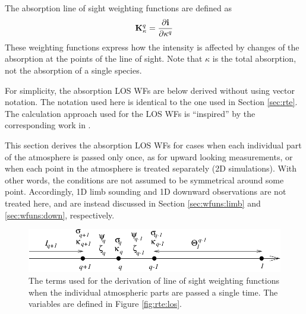  The absorption line of sight weighting functions are defined as
 \begin{equation}
   \mathbf{K}_{\kappa}^q =  \frac{\partial\mathbf{i}}{\partial \kappa^q}
  \label{eq:wfuns:loswfs}
 \end{equation}
 These weighting functions express how the intensity is
 affected by changes of the absorption at the points of the line of
 sight. Note that $\kappa$ is the total absorption, not the
 absorption of a single species. 
 
 For simplicity, the absorption LOS WFs are below derived without
 using vector notation. The notation used here is identical to the one
 used in Section \ref{sec:rte}. The calculation approach used for the
 LOS WFs is ``inspired'' by the corresponding work in
 \citet{master00}.


 \label{sec:wfuns:single}
 
 This section derives the absorption LOS WFs for cases when each
 individual part of the atmosphere is passed only once, as for upward
 looking measurements, or when each point in the atmosphere is treated
 separately (2D simulations). With other words, the conditions are not
 assumed to be symmetrical around some point. Accordingly, 1D limb
 sounding and 1D downward observations are not treated here, and are
 instead discussed in Section \ref{sec:wfuns:limb} and
 \ref{sec:wfuns:down}, respectively.

 \begin{figure}[t]
  \begin{center}
   \includegraphics*[width=0.95\hsize]{Figs/wf1}
   \caption{The terms used for the derivation of line of sight weighting
            functions when the individual atmospheric parts are passed a
            single time. The variables are defined in Figure 
            \ref{fig:rte:los}.}
   \label{fig:wfuns:single}  
  \end{center}
 \end{figure}

